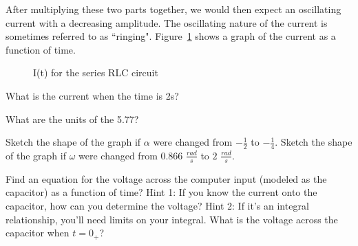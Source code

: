 After multiplying these two parts together, we would then expect an oscillating current with a decreasing amplitude. The oscillating nature of the current is sometimes referred to as ``ringing". Figure~\ref{F:6RLCG} shows a graph of the current as a function of time.

\begin{figure}[H]
\begin{center}
\caption{I(t) for the series RLC circuit}
\label{F:6RLCG}
\end{center}
\end{figure}

\begin{alevel}
What is the current when the time is 2s?
\end{alevel}

\begin{blevel}
What are the units of the 5.77?
\end{blevel}

\begin{blevel}
Sketch the shape of the graph if $\alpha$ were changed from $-\frac{1}{2}$ to $-\frac{1}{4}$. Sketch the shape of the graph if $\omega$ were changed from $0.866$ $\frac{rad}{s}$ to $2$ $\frac{rad}{s}$.  
\end{blevel}

\begin{clevel}
Find an equation for the voltage across the computer input (modeled as the capacitor) as a function of time? Hint 1: If you know the current onto the capacitor, how can you determine the voltage? Hint 2: If it's an integral relationship, you'll need limits on your integral. What is the voltage across the capacitor when $t=0_+$?
\end{clevel}

